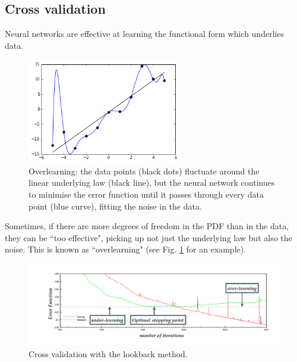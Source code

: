 \subsection{Cross validation}
Neural networks are effective at learning the functional form which underlies data.
\begin{figure}[H]
\centering
\includegraphics[width=0.6\textwidth]{background/overfitteddata.png}
\caption{\label{fig:overlearning}Overlearning: the data points (black dots) fluctuate around the linear underlying law (black line), but the neural network continues to minimise the error function until it passes through every data point (blue curve), fitting the noise in the data.}
\end{figure}
Sometimes, if there are more degrees of freedom in the PDF than in the data, they can be ``too effective", picking up not just the underlying law but also the noise. This is known as ``overlearning" (see Fig. \ref{fig:overlearning} for an example).
\begin{figure}[h]
\centering
\includegraphics[width=\textwidth]{background/crossvalidation.png}
\caption{\label{fig:crossvalidation} Cross validation with the lookback method.}
\end{figure}

